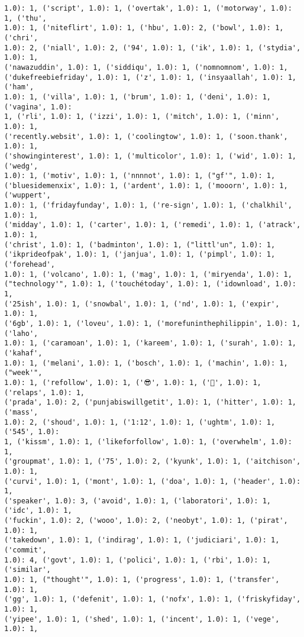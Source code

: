 \documentclass[11pt]{article}
\begin{document}
\begin{Verbatim}[commandchars=\\\{\}]
1.0): 1, ('script', 1.0): 1, ('overtak', 1.0): 1, ('motorway', 1.0): 1, ('thu',
1.0): 1, ('niteflirt', 1.0): 1, ('hbu', 1.0): 2, ('bowl', 1.0): 1, ('chri',
1.0): 2, ('niall', 1.0): 2, ('94', 1.0): 1, ('ik', 1.0): 1, ('stydia', 1.0): 1,
('nawazuddin', 1.0): 1, ('siddiqu', 1.0): 1, ('nomnomnom', 1.0): 1,
('dukefreebiefriday', 1.0): 1, ('z', 1.0): 1, ('insyaallah', 1.0): 1, ('ham',
1.0): 1, ('villa', 1.0): 1, ('brum', 1.0): 1, ('deni', 1.0): 1, ('vagina', 1.0):
1, ('rli', 1.0): 1, ('izzi', 1.0): 1, ('mitch', 1.0): 1, ('minn', 1.0): 1,
('recently.websit', 1.0): 1, ('coolingtow', 1.0): 1, ('soon.thank', 1.0): 1,
('showinginterest', 1.0): 1, ('multicolor', 1.0): 1, ('wid', 1.0): 1, ('wedg',
1.0): 1, ('motiv', 1.0): 1, ('nnnnot', 1.0): 1, ("gf'", 1.0): 1,
('bluesidemenxix', 1.0): 1, ('ardent', 1.0): 1, ('mooorn', 1.0): 1, ('wuppert',
1.0): 1, ('fridayfunday', 1.0): 1, ('re-sign', 1.0): 1, ('chalkhil', 1.0): 1,
('midday', 1.0): 1, ('carter', 1.0): 1, ('remedi', 1.0): 1, ('atrack', 1.0): 1,
('christ', 1.0): 1, ('badminton', 1.0): 1, ("littl'un", 1.0): 1,
('ikprideofpak', 1.0): 1, ('janjua', 1.0): 1, ('pimpl', 1.0): 1, ('forehead',
1.0): 1, ('volcano', 1.0): 1, ('mag', 1.0): 1, ('miryenda', 1.0): 1,
("technology'", 1.0): 1, ('touchétoday', 1.0): 1, ('idownload', 1.0): 1,
('25ish', 1.0): 1, ('snowbal', 1.0): 1, ('nd', 1.0): 1, ('expir', 1.0): 1,
('6gb', 1.0): 1, ('loveu', 1.0): 1, ('morefuninthephilippin', 1.0): 1, ('laho',
1.0): 1, ('caramoan', 1.0): 1, ('kareem', 1.0): 1, ('surah', 1.0): 1, ('kahaf',
1.0): 1, ('melani', 1.0): 1, ('bosch', 1.0): 1, ('machin', 1.0): 1, ("week'",
1.0): 1, ('refollow', 1.0): 1, ('😎', 1.0): 1, ('💁', 1.0): 1, ('relaps', 1.0): 1,
('prada', 1.0): 2, ('punjabiswillgetit', 1.0): 1, ('hitter', 1.0): 1, ('mass',
1.0): 2, ('shoud', 1.0): 1, ('1:12', 1.0): 1, ('ughtm', 1.0): 1, ('545', 1.0):
1, ('kissm', 1.0): 1, ('likeforfollow', 1.0): 1, ('overwhelm', 1.0): 1,
('groupmat', 1.0): 1, ('75', 1.0): 2, ('kyunk', 1.0): 1, ('aitchison', 1.0): 1,
('curvi', 1.0): 1, ('mont', 1.0): 1, ('doa', 1.0): 1, ('header', 1.0): 1,
('speaker', 1.0): 3, ('avoid', 1.0): 1, ('laboratori', 1.0): 1, ('idc', 1.0): 1,
('fuckin', 1.0): 2, ('wooo', 1.0): 2, ('neobyt', 1.0): 1, ('pirat', 1.0): 1,
('takedown', 1.0): 1, ('indirag', 1.0): 1, ('judiciari', 1.0): 1, ('commit',
1.0): 4, ('govt', 1.0): 1, ('polici', 1.0): 1, ('rbi', 1.0): 1, ('similar',
1.0): 1, ("thought'", 1.0): 1, ('progress', 1.0): 1, ('transfer', 1.0): 1,
('gg', 1.0): 1, ('defenit', 1.0): 1, ('nofx', 1.0): 1, ('friskyfiday', 1.0): 1,
('yipee', 1.0): 1, ('shed', 1.0): 1, ('incent', 1.0): 1, ('vege', 1.0): 1,

\end{Verbatim}
\end{document}
